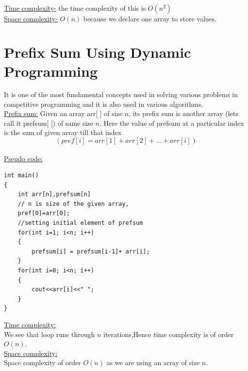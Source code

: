 \documentclass[12pt]{book}
\begin{document}
\underline{Time complexity-} the time complexity of this is $O(n^2)$\\

\underline{Space complexity-} $O(n)$ because we declare one array to store values.\\

\chapter{Prefix Sum Using Dynamic Programming}
It is one of the most fundamental concepts used in solving various problems in competitive programming and it is also used in various algorithms.\\
\underline{Prefix sum:} Given an array arr[ ] of size $n$, its prefix sum is another array (lets call it prefsum[ ]) of same size $n$. Here the value of prefsum at a particular index is the sum of given array till that index\\

\[(pref[i] = arr[1] + arr[2] + ...  + arr[i])\]\\

\underline{Pseudo code:}\\
\begin{lstlisting}
int main()
{
    int arr[n],prefsum[n]
	// n is size of the given array,
    pref[0]=arr[0];
	//setting initial element of prefsum
    for(int i=1; i<n; i++)
    {
        prefsum[i] = prefsum[i-1]+ arr[i];
    }
    for(int i=0; i<n; i++)
    {
        cout<<arr[i]<<" ";
    }
}
\end{lstlisting}

\underline{Time complexity:}\\
We see that loop runs through $n$ iterations,Hence time complexity is of order $O(n)$.\\

\underline{Space complexity:}\\
Space complexity of order $O(n)$ as we are using an array of size $n$.\\
\end{document}
